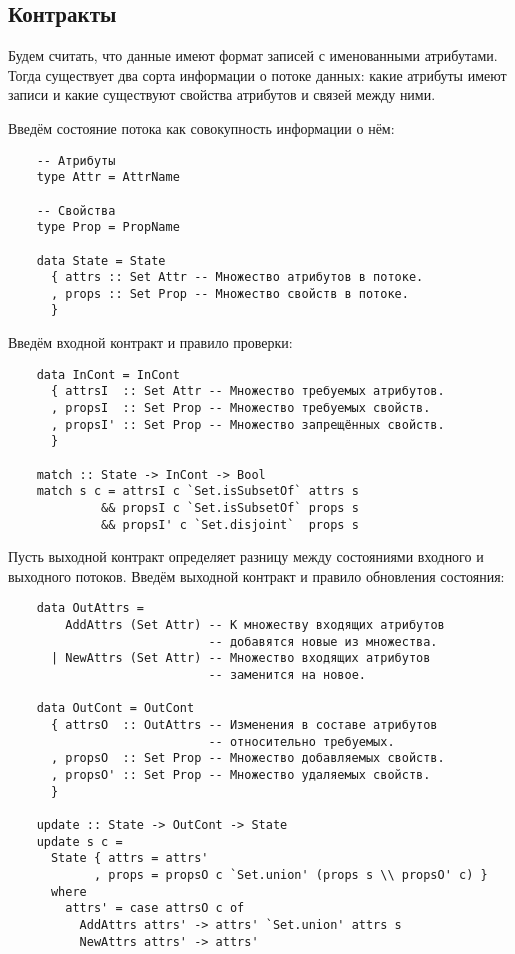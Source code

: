 \subsection{Контракты}

Будем считать, что данные имеют формат записей с именованными атрибутами.
Тогда существует два сорта информации о потоке данных: какие атрибуты имеют записи и какие существуют свойства атрибутов и связей между ними.

Введём состояние потока как совокупность информации о нём:
\begin{lstlisting}
    -- Атрибуты
    type Attr = AttrName

    -- Свойства
    type Prop = PropName

    data State = State
      { attrs :: Set Attr -- Множество атрибутов в потоке.
      , props :: Set Prop -- Множество свойств в потоке.
      }
\end{lstlisting}

Введём входной контракт и правило проверки:
\begin{lstlisting}
    data InCont = InCont
      { attrsI  :: Set Attr -- Множество требуемых атрибутов.
      , propsI  :: Set Prop -- Множество требуемых свойств.
      , propsI' :: Set Prop -- Множество запрещённых свойств.
      }

    match :: State -> InCont -> Bool
    match s c = attrsI c `Set.isSubsetOf` attrs s
             && propsI c `Set.isSubsetOf` props s
             && propsI' c `Set.disjoint`  props s
\end{lstlisting}

Пусть выходной контракт определяет разницу между состояниями входного и выходного потоков. Введём выходной контракт и правило обновления состояния:

\begin{lstlisting}
    data OutAttrs =
        AddAttrs (Set Attr) -- К множеству входящих атрибутов
                            -- добавятся новые из множества.
      | NewAttrs (Set Attr) -- Множество входящих атрибутов
                            -- заменится на новое.

    data OutCont = OutCont
      { attrsO  :: OutAttrs -- Изменения в составе атрибутов
                            -- относительно требуемых.
      , propsO  :: Set Prop -- Множество добавляемых свойств.
      , propsO' :: Set Prop -- Множество удаляемых свойств.
      }

    update :: State -> OutCont -> State
    update s c =
      State { attrs = attrs'
            , props = propsO c `Set.union' (props s \\ propsO' c) }
      where
        attrs' = case attrsO c of
          AddAttrs attrs' -> attrs' `Set.union' attrs s
          NewAttrs attrs' -> attrs'
\end{lstlisting}

